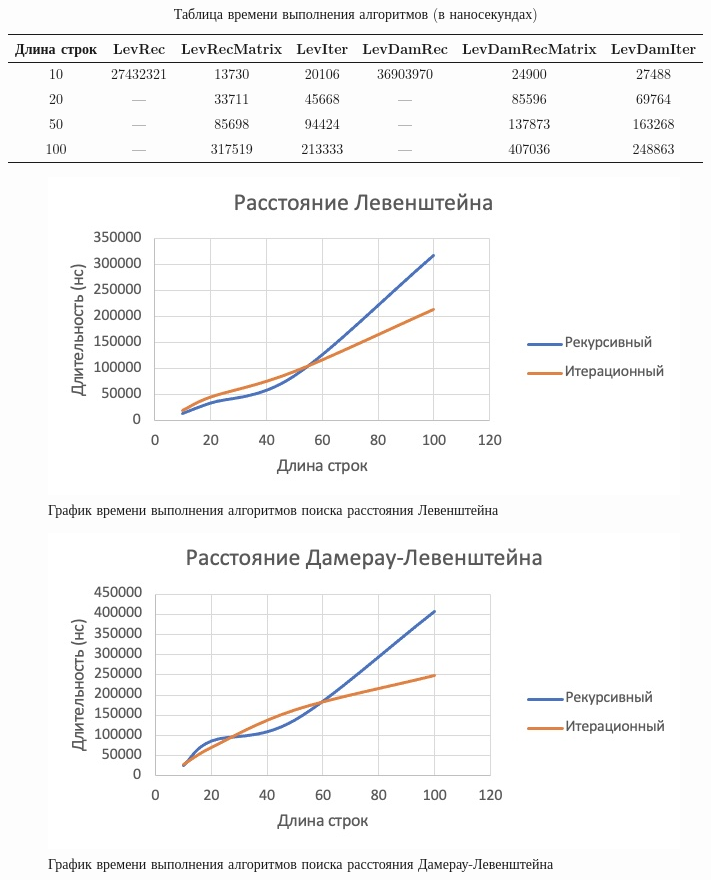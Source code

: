 \documentclass[12pt]{report}
\begin{document}
    \begin{table}[H]
        \caption{Таблица времени выполнения алгоритмов (в наносекундах)}
        \label{tab:times}
        \centering
        \begin{tabular}{|c c c c c c c|}
            \hline
            Длина строк & LevRec & LevRecMatrix   & LevIter & LevDamRec & LevDamRecMatrix & LevDamIter  \\
            \hline
            10          & 27432321     & 13730 & 20106        & 36903970       & 24900 & 27488           \\
            \hline
            20          & ---    & 33711      & 45668        & ---      & 85596       & 69764          \\
            \hline
            50          & ---   & 85698      & 94424        & ---      & 137873       & 163268         \\
            \hline
            100         & ---   & 317519      & 213333      & ---     & 407036       & 248863         \\
            \hline
        \end{tabular}
    \end{table}

    \begin{figure}[H]
        \centering
        \includegraphics[scale=0.75]{img/levGraphic}
        \caption{График времени выполнения алгоритмов поиска расстояния Левенштейна}
        \label{fig:levGraphic}
    \end{figure}

    \begin{figure}[H]
        \centering
        \includegraphics[scale=0.75]{img/levDamGraphic}
        \caption{График времени выполнения алгоритмов поиска расстояния Дамерау-Левенштейна}
        \label{fig:levDamGraphic}
    \end{figure}
\end{document}
